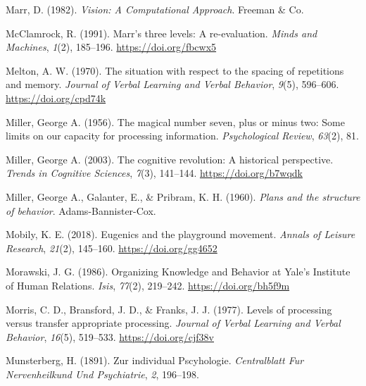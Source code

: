 \documentclass[
  oneside,
  12pt]{crumpbook}
\newlength{\cslhangindent}
\newlength{\cslentryspacingunit} %
\newenvironment{CSLReferences}[2] %
 {%
  \setlength{\parindent}{0pt}
  \ifodd #1
  \let\oldpar\par
  \def\par{\hangindent=\cslhangindent\oldpar}
  \fi
  \setlength{\parskip}{#2\cslentryspacingunit}
 }%
 {}
\begin{document}
\begin{CSLReferences}{1}{0}
\leavevmode{}%
Marr, D. (1982). \emph{Vision: {A Computational Approach}}. {Freeman \& Co}.

\leavevmode{}%
McClamrock, R. (1991). Marr's three levels: {A} re-evaluation. \emph{Minds and Machines}, \emph{1}(2), 185--196. \url{https://doi.org/fbcwx5}

\leavevmode{}%
Melton, A. W. (1970). The situation with respect to the spacing of repetitions and memory. \emph{Journal of Verbal Learning and Verbal Behavior}, \emph{9}(5), 596--606. \url{https://doi.org/cpd74k}

\leavevmode{}%
Miller, George A. (1956). The magical number seven, plus or minus two: {Some} limits on our capacity for processing information. \emph{Psychological Review}, \emph{63}(2), 81.

\leavevmode{}%
Miller, George A. (2003). The cognitive revolution: A historical perspective. \emph{Trends in Cognitive Sciences}, \emph{7}(3), 141--144. \url{https://doi.org/b7wqdk}

\leavevmode{}%
Miller, George A., Galanter, E., \& Pribram, K. H. (1960). \emph{Plans and the structure of behavior}. {Adams-Bannister-Cox}.

\leavevmode{}%
Mobily, K. E. (2018). Eugenics and the playground movement. \emph{Annals of Leisure Research}, \emph{21}(2), 145--160. \url{https://doi.org/gg4652}

\leavevmode{}%
Morawski, J. G. (1986). Organizing {Knowledge} and {Behavior} at {Yale}'s {Institute} of {Human Relations}. \emph{Isis}, \emph{77}(2), 219--242. \url{https://doi.org/bh5f9m}

\leavevmode{}%
Morris, C. D., Bransford, J. D., \& Franks, J. J. (1977). Levels of processing versus transfer appropriate processing. \emph{Journal of Verbal Learning and Verbal Behavior}, \emph{16}(5), 519--533. \url{https://doi.org/cjf38v}

\leavevmode{}%
Munsterberg, H. (1891). Zur individual {Pscyhologie}. \emph{Centralblatt Fur Nervenheilkund Und Psychiatrie}, \emph{2}, 196--198.


\end{CSLReferences}
\end{document}
